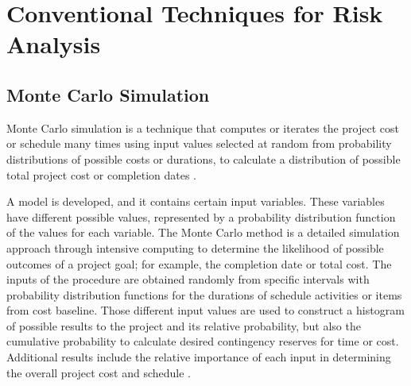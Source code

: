 \section{Conventional Techniques for Risk Analysis}

\subsection{Monte Carlo Simulation}

Monte Carlo simulation is a technique that computes or iterates the project cost or schedule many times using input values selected at random from probability distributions of possible costs or durations, to calculate a distribution of possible total project cost or completion dates \cite{PMBOK2008}.

A model is developed, and it contains certain input variables. These variables have different possible values, represented by a probability distribution function of the values for each variable. The Monte Carlo method is a detailed simulation approach through intensive computing to determine the likelihood of possible outcomes of a project goal; for example, the completion date or total cost. The inputs of the procedure are obtained randomly from specific intervals with probability distribution functions for the durations of schedule activities or items from cost baseline. Those different input values are used to construct a histogram of possible results to the project and its relative probability, but also the cumulative probability to calculate desired contingency reserves for time or cost. Additional results include the relative importance of each input in determining the overall project cost and schedule \cite{kwak2007exploring}.

